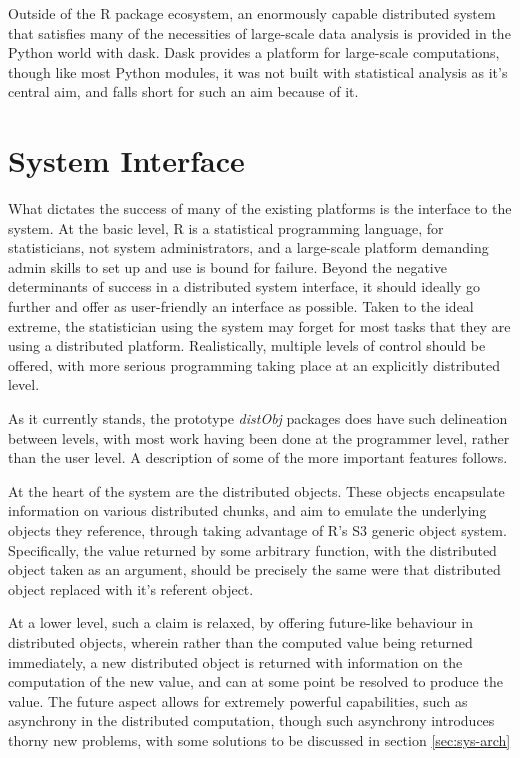 \documentclass[a4paper,10pt]{article}
\begin{document}
Outside of the R package ecosystem, an enormously capable distributed system
that satisfies many of the necessities of large-scale data analysis is provided
in the Python world with dask\cite{rocklin2015dask}.
Dask provides a platform for large-scale computations, though like most Python
modules, it was not built with statistical analysis as it's central aim, and
falls short for such an aim because of it.

\section{System Interface}

What dictates the success of many of the existing platforms is the interface to
the system.
At the basic level, R is a statistical programming language, for statisticians,
not system administrators, and a large-scale platform demanding admin skills to
set up and use is bound for failure.
Beyond the negative determinants of success in a distributed system interface,
it should ideally go further and offer as user-friendly an interface as
possible.
Taken to the ideal extreme, the statistician using the system may forget for
most tasks that they are using a distributed platform.
Realistically, multiple levels of control should be offered, with more serious
programming taking place at an explicitly distributed level.

As it currently stands, the prototype \textit{distObj} packages does have such
delineation between levels, with most work having been done at the programmer
level, rather than the user level.
A description of some of the more important features follows.

At the heart of the system are the distributed objects.
These objects encapsulate information on various distributed chunks, and aim to
emulate the underlying objects they reference, through taking advantage of R's
S3 generic object system.
Specifically, the value returned by some arbitrary function, with the
distributed object taken as an argument, should be precisely the same were that
distributed object replaced with it's referent object.

At a lower level, such a claim is relaxed, by offering future-like behaviour in
distributed objects, wherein rather than the computed value being returned
immediately, a new distributed object is returned with information on the
computation of the new value, and can at some point be resolved to produce the
value.
The future aspect allows for extremely powerful capabilities, such as
asynchrony in the distributed computation, though such asynchrony introduces
thorny new problems, with some solutions to be discussed in section
\ref{sec:sys-arch}
\end{document}
